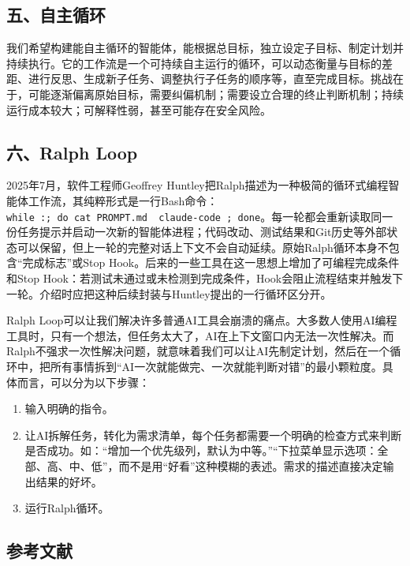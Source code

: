 \hypertarget{ux4e94ux81eaux4e3bux5faaux73af}{%
\subsection{五、自主循环}\label{ux4e94ux81eaux4e3bux5faaux73af}}

我们希望构建能自主循环的智能体，能根据总目标，独立设定子目标、制定计划并持续执行。它的工作流是一个可持续自主运行的循环，可以动态衡量与目标的差距、进行反思、生成新子任务、调整执行子任务的顺序等，直至完成目标。挑战在于，可能逐渐偏离原始目标，需要纠偏机制；需要设立合理的终止判断机制；持续运行成本较大；可解释性弱，甚至可能存在安全风险。

\hypertarget{ux516dralph-loop}{%
\subsection{六、Ralph Loop}\label{ux516dralph-loop}}

2025年7月，软件工程师Geoffrey Huntley把Ralph描述为一种极简的循环式编程智能体工作流，其纯粹形式是一行Bash命令：\texttt{while\ :;\ do\ cat\ PROMPT.md\ \textbar{}\ claude-code\ ;\ done}。每一轮都会重新读取同一份任务提示并启动一次新的智能体进程；代码改动、测试结果和Git历史等外部状态可以保留，但上一轮的完整对话上下文不会自动延续。原始Ralph循环本身不包含``完成标志''或Stop Hook。后来的一些工具在这一思想上增加了可编程完成条件和Stop Hook：若测试未通过或未检测到完成条件，Hook会阻止流程结束并触发下一轮。介绍时应把这种后续封装与Huntley提出的一行循环区分开。

Ralph Loop可以让我们解决许多普通AI工具会崩溃的痛点。大多数人使用AI编程工具时，只有一个想法，但任务太大了，AI在上下文窗口内无法一次性解决。而Ralph不强求一次性解决问题，就意味着我们可以让AI先制定计划，然后在一个循环中，把所有事情拆到``AI一次就能做完、一次就能判断对错''的最小颗粒度。具体而言，可以分为以下步骤：

\begin{enumerate}
\def\labelenumi{\arabic{enumi}.}
\item
  输入明确的指令。
\item
  让AI拆解任务，转化为需求清单，每个任务都需要一个明确的检查方式来判断是否成功。如：``增加一个优先级列，默认为中等。''``下拉菜单显示选项：全部、高、中、低''，而不是用``好看''这种模糊的表述。需求的描述直接决定输出结果的好坏。
\item
  运行Ralph循环。
\end{enumerate}

\hypertarget{ux53c2ux8003ux6587ux732e-114}{%
\subsection{参考文献}\label{ux53c2ux8003ux6587ux732e-114}}

